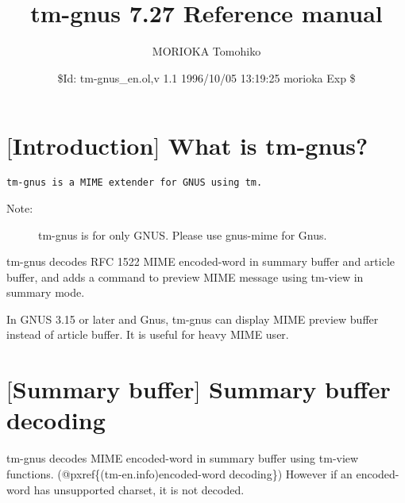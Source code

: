 \setcounter{secnumdepth}{6}
\setcounter{tocdepth}{6}
\topsep=0.1cm
\parsep=0.1cm
\itemsep=0.0cm

\title{
tm-gnus 7.27 Reference manual}
\author{
MORIOKA Tomohiko\\
}
\date{
\$Id: tm-gnus\_en.ol,v 1.1 1996/10/05 13:19:25 morioka Exp \$}
\maketitle
\medskip

\section{$[$Introduction$]$ What is tm-gnus?}
\medskip
{\baselineskip=10pt
\begin{verbatim}
tm-gnus is a MIME extender for GNUS using tm.
\end{verbatim}}
\medskip
\begin{description}
\item[Note:]tm-gnus is for only GNUS. Please use gnus-mime for Gnus.
\medskip
\end{description}
\par
tm-gnus decodes RFC 1522 MIME encoded-word in summary buffer and
article buffer, and adds a command to preview MIME message using
tm-view in summary mode.
\medskip
\par
In GNUS 3.15 or later and Gnus, tm-gnus can display MIME preview
buffer instead of article buffer. It is useful for heavy MIME user.
\medskip
\medskip

\section{$[$Summary buffer$]$ Summary buffer decoding}
\medskip
\par
tm-gnus decodes MIME encoded-word in summary buffer using tm-view
functions. (@pxref\{(tm-en.info)encoded-word decoding\}) However if an
encoded-word has unsupported charset, it is not decoded.
\medskip
\medskip


